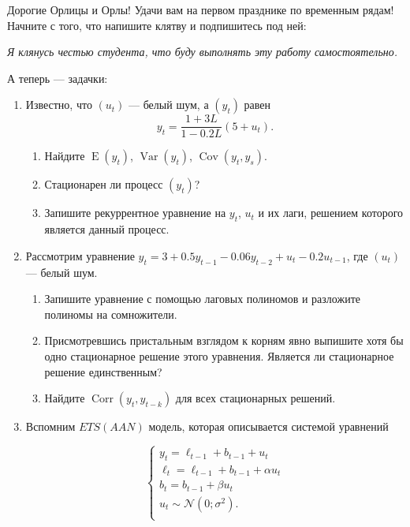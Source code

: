 \documentclass[12pt]{article}
\DeclareMathOperator{\Cov}{Cov}
\DeclareMathOperator{\Corr}{Corr}
\DeclareMathOperator{\Var}{Var}
\DeclareMathOperator{\E}{E}
\def \cN{\mathcal{N}}
\begin{document}
Дорогие Орлицы и Орлы! Удачи вам на первом празднике по временным рядам!
Начните с того, что напишите клятву и подпишитесь под ней:

\vspace{10pt}
\textit{Я клянусь честью студента, что буду выполнять эту работу самостоятельно.}
\vspace{10pt}


А теперь — задачки:

\begin{enumerate}

\item Известно, что $(u_t)$ — белый шум, а $(y_t)$ равен 
\[
y_t = \frac{1 + 3L}{1 - 0.2 L} (5 + u_t).	
\]
\begin{enumerate}
	\item Найдите $\E(y_t)$, $\Var(y_t)$, $\Cov(y_t, y_s)$.
	\item Стационарен ли процесс $(y_t)$?
	\item Запишите рекуррентное уравнение на $y_t$, $u_t$ и их лаги, решением которого является данный процесс. 
\end{enumerate}

\item Рассмотрим уравнение $y_t = 3 + 0.5 y_{t-1} - 0.06 y_{t-2} + u_t - 0.2 u_{t-1}$, где $(u_t)$ — белый шум. 

\begin{enumerate}
	\item Запишите уравнение с помощью лаговых полиномов и разложите полиномы на сомножители. 
	\item Присмотревшись пристальным взглядом к корням явно выпишите хотя бы одно стационарное решение этого уравнения. 
	Является ли стационарное решение единственным?
	\item Найдите $\Corr(y_t, y_{t-k})$ для всех стационарных решений. 
\end{enumerate}

\item Вспомним $ETS(AAN)$ модель, которая описывается системой уравнений

\[
\begin{cases}
y_t = \ell_{t-1} + b_{t-1} + u_t \\
\ell_t = \ell_{t-1} + b_{t-1} + \alpha u_t \\
b_t = b_{t-1} + \beta u_t \\
u_t \sim \cN(0;\sigma^2). \\
\end{cases}
\]


\end{enumerate}
\end{document}
